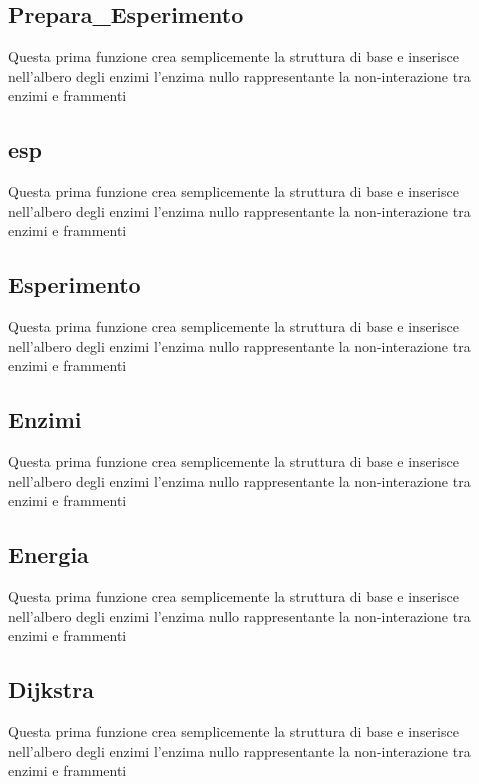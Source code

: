 \documentclass[a4paper,10pt]{article}
\begin{document}
\subsection{Prepara\_{}Esperimento}
Questa prima funzione crea semplicemente la struttura di base e inserisce nell'albero degli enzimi l'enzima nullo rappresentante la non-interazione tra enzimi e frammenti
\begin{algorithm}[H]
\end{algorithm}
\subsection{esp}
Questa prima funzione crea semplicemente la struttura di base e inserisce nell'albero degli enzimi l'enzima nullo rappresentante la non-interazione tra enzimi e frammenti
\begin{algorithm}[H]
\end{algorithm}
\subsection{Esperimento}
Questa prima funzione crea semplicemente la struttura di base e inserisce nell'albero degli enzimi l'enzima nullo rappresentante la non-interazione tra enzimi e frammenti
\begin{algorithm}[H]
\end{algorithm}
\subsection{Enzimi}
Questa prima funzione crea semplicemente la struttura di base e inserisce nell'albero degli enzimi l'enzima nullo rappresentante la non-interazione tra enzimi e frammenti
\begin{algorithm}[H]
\end{algorithm}
\subsection{Energia}
Questa prima funzione crea semplicemente la struttura di base e inserisce nell'albero degli enzimi l'enzima nullo rappresentante la non-interazione tra enzimi e frammenti
\begin{algorithm}[H]
\end{algorithm}
\subsection{Dijkstra}
Questa prima funzione crea semplicemente la struttura di base e inserisce nell'albero degli enzimi l'enzima nullo rappresentante la non-interazione tra enzimi e frammenti
\begin{algorithm}[H]
\end{algorithm}
\end{document}
